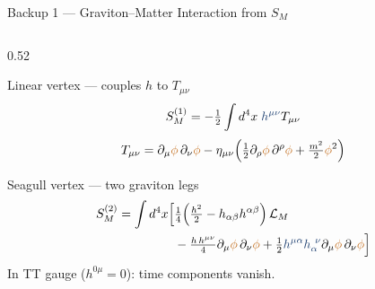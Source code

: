 \documentclass[aspectratio=169]{beamer}
\begin{document}
\begin{frame}[c]{Backup 1 — Graviton–Matter Interaction from $S_M$}
\begin{columns}[T, totalwidth=\textwidth]
\begin{column}{0.52\textwidth}
\begin{block}{Linear vertex — couples $h$ to $T_{\mu\nu}$}
\footnotesize
\[
S_M^{(1)}=-\half\int d^4x\;
\grav{h^{\mu\nu}}T_{\mu\nu}
\]
\[
T_{\mu\nu}=\partial_\mu\matt{\phi}\,\partial_\nu\matt{\phi}
-\eta_{\mu\nu}\!\left(\half\partial_\rho\matt{\phi}\,\partial^\rho\matt{\phi}
+\tfrac{m^2}{2}\matt{\phi}^2\right)
\]
\end{block}
 
\vspace{0.2cm}
 
\begin{block}{Seagull vertex — two graviton legs}
\footnotesize
\begin{align*}
S_M^{(2)}=\int d^4x\Bigl[&
\tfrac{1}{4}\!\left(\tfrac{h^2}{2}-h_{\alpha\beta}h^{\alpha\beta}\right)\mathcal{L}_M\\
&-\tfrac{h\,h^{\mu\nu}}{4}\partial_\mu\matt{\phi}\,\partial_\nu\matt{\phi}
+\half\grav{h^{\mu\alpha}h_\alpha^{\ \nu}}\partial_\mu\matt{\phi}\,\partial_\nu\matt{\phi}
\Bigr]
\end{align*}
In TT gauge ($h^{0\mu}=0$): time components vanish.
\end{block}
 
\end{column}
\end{columns}
 
\end{frame}
 
\end{document}
